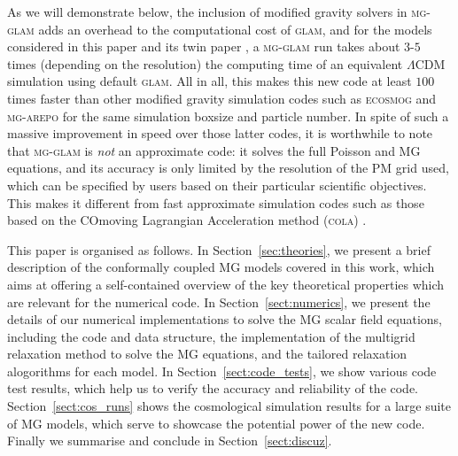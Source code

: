 As we will demonstrate below, the inclusion of modified gravity solvers in \textsc{mg-glam} adds an overhead to the computational cost of \textsc{glam}, and for the models considered in this paper and its twin paper \cite{Hernandez-Aguayo:2021_twin_paper}, a \textsc{mg-glam} run takes about $3$-$5$ times (depending on the resolution) the computing time of an equivalent $\Lambda$CDM simulation using default \textsc{glam}. All in all, this makes this new code at least $100$ times faster than other modified gravity simulation codes such as \textsc{ecosmog} \cite{Li:2011_ECOSMOG_code_paper,Li:2013_ECOSMOGV_code_paper,2012JCAP...10..002B,Brax:2013mua} and \textsc{mg-arepo} \cite{Arnold:2019_MGAREPO_code_paper,Hernandez-Aguayo:2020_MGAREPO_code_paper} for the same simulation boxsize and particle number. In spite of such a massive improvement in speed over those latter codes, it is worthwhile to note that \textsc{mg-glam} is \textit{not} an approximate code: it solves the full Poisson and MG equations, and its accuracy is only limited by the resolution of the PM grid used, which can be specified by users based on their particular scientific objectives. This makes it different from fast approximate simulation codes such as those  \cite{Winther:2017j_MGCOLA_code_paper,Wright:2017_NUCOLA_code_paper,Valogiannis:2016_MGCOLA_code_paper,Fiorini:2021_MGCOLA_application_haloes} based on the COmoving Lagrangian Acceleration method (\textsc{cola}) \cite{Tassev:2013_COLA_code_paper}.



This paper is organised as follows. In Section~\ref{sec:theories}, we present a brief description of the conformally coupled \ac{MG} models covered in this work, which aims at offering a self-contained overview of the key theoretical properties which are relevant for the numerical code.  In Section~\ref{sect:numerics}, we present the details of our numerical implementations to solve the \ac{MG} scalar field equations, including the code and data structure, the implementation of the multigrid relaxation method to solve the MG equations, and the tailored relaxation alogorithms for each model. In Section~\ref{sect:code_tests}, we show various code test results, which help us to verify the accuracy and reliability of the code. Section~\ref{sect:cos_runs} shows the cosmological simulation results for a large suite of MG models, which serve to showcase the potential power of the new code. Finally we summarise and conclude in Section~\ref{sect:discuz}.

